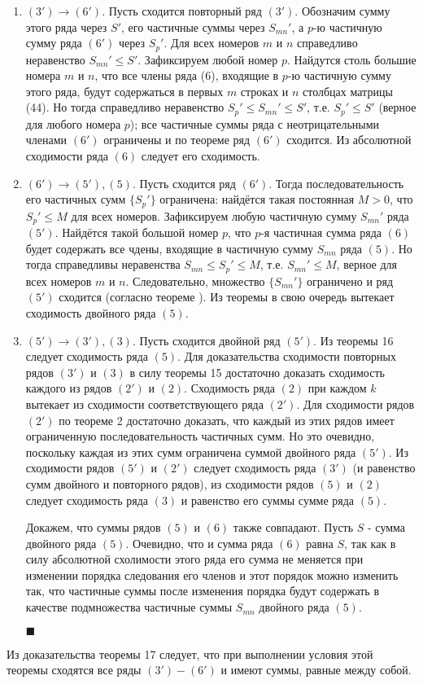  \begin{enumerate}
 	\item $(3') \rightarrow (6')$. Пусть сходится повторный ряд $(3')$. Обозначим сумму этого ряда через $S'$, его частичные суммы через $S_{mn}'$, а $p$-ю частичную сумму ряда $(6')$ через $S_p'$. Для всех номеров $m$ и $n$ справедливо неравенство $S_{mn}' \leqslant S'$. Зафиксируем любой номер $p$. Найдутся столь большие номера $m$ и $n$, что все члены ряда (6), входящие в $p$-ю частичную сумму этого ряда, будут содержаться в первых $m$ строках и $n$ столбцах матрицы (44). Но тогда справедливо неравенство $S_p' \leqslant S_{mn}' \leqslant S'$, т.е. $S_p' \leqslant S'$ (верное для любого номера $p$); все частичные суммы ряда с неотрицательными членами $(6')$ ограничены и по теореме  ряд $(6')$ сходится. Из абсолютной сходимости ряда $(6)$ следует его сходимость.
 	
 	\item $(6') \rightarrow (5'), (5)$. Пусть сходится ряд $(6')$. Тогда последовательность его частичных сумм $\{S_p'\}$ ограничена: найдётся такая постоянная $M > 0$, что $S_p' \leqslant M$ для всех номеров. Зафиксируем любую частичную сумму $S_{mn}'$ ряда $(5')$. Найдётся такой большой номер $p$, что $p$-я частичная сумма ряда $(6)$ будет содержать все чдены, входящие в частичную сумму $S_{mn}$ ряда $(5)$. Но тогда справедливы неравенства $S_{mn} \leqslant S_p' \leqslant M$, т.е. $S_{mn}' \leqslant M$, верное для всех номеров $m$ и $n$. Следовательно, множество $\{S_{mn}'\}$ ограничено и ряд $(5')$ сходится (согласно теореме ). Из теоремы  в свою очередь вытекает сходимость двойного ряда $(5)$.
 	
 	\item $(5') \rightarrow (3'), (3)$. Пусть сходится двойной ряд $(5')$. Из теоремы 16 следует сходимость ряда $(5)$. Для доказательства сходимости повторных рядов $(3')$ и $(3)$ в силу теоремы 15 достаточно доказать сходимость каждого из рядов $(2')$ и $(2)$. Сходимость ряда $(2)$ при каждом $k$ вытекает из сходимости соответствующего ряда $(2')$. Для сходимости рядов $(2')$ по теореме 2 достаточно доказать, что каждый из этих рядов имеет ограниченную последовательность частичных сумм. Но это очевидно, поскольку каждая из этих сумм ограничена суммой двойного ряда $(5')$. Из сходимости рядов $(5')$ и $(2')$ следует сходимость ряда $(3')$ (и равенство сумм двойного и повторного рядов), из сходимости рядов $(5)$ и $(2)$ следует сходимость ряда $(3)$ и равенство его суммы сумме ряда $(5)$.
 	
 	Докажем, что суммы рядов $(5)$ и $(6)$ также совпадают. Пусть $S$ - сумма двойного ряда $(5)$. Очевидно, что и сумма ряда $(6)$ равна $S$, так как в силу абсолютной схолимости этого ряда его сумма не меняется при изменении порядка следования его членов и этот порядок можно изменить так, что частичные суммы после изменения порядка будут содержать в качестве подмножества частичные суммы $S_{mn}$ двойного ряда $(5)$.
 	
 	\begin{flushright}
 		$\blacksquare$
 	\end{flushright}
 \end{enumerate}
 
 \begin{note}
 	Из доказательства теоремы 17 следует, что при выполнении условия этой теоремы сходятся все ряды $(3')-(6')$ и имеют суммы, равные между собой.
 \end{note}